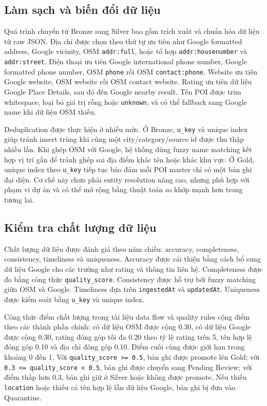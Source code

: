 \documentclass[12pt,a4paper]{article}
\begin{document}
\subsection{Làm sạch và biến đổi dữ liệu}

Quá trình chuyển từ Bronze sang Silver bao gồm trích xuất và chuẩn hóa dữ liệu từ raw JSON. Địa chỉ được chọn theo thứ tự ưu tiên như Google formatted address, Google vicinity, OSM \texttt{addr:full}, hoặc tổ hợp \texttt{addr:housenumber} và \texttt{addr:street}. Điện thoại ưu tiên Google international phone number, Google formatted phone number, OSM \texttt{phone} rồi OSM \texttt{contact:phone}. Website ưu tiên Google website, OSM website rồi OSM contact website. Rating ưu tiên dữ liệu Google Place Details, sau đó đến Google nearby result. Tên POI được trim whitespace, loại bỏ giá trị rỗng hoặc \texttt{unknown}, và có thể fallback sang Google name khi dữ liệu OSM thiếu.

Deduplication được thực hiện ở nhiều mức. Ở Bronze, \texttt{u\_key} và unique index giúp tránh insert trùng khi cùng một city/category/source id được thu thập nhiều lần. Khi ghép OSM với Google, hệ thống dùng fuzzy name matching kết hợp vị trí gần để tránh ghép sai địa điểm khác tên hoặc khác khu vực. Ở Gold, unique index theo \texttt{u\_key} tiếp tục bảo đảm mỗi POI master chỉ có một bản ghi đại diện. Cơ chế này chưa phải entity resolution nâng cao, nhưng phù hợp với phạm vi dự án và có thể mở rộng bằng thuật toán so khớp mạnh hơn trong tương lai.

\subsection{Kiểm tra chất lượng dữ liệu}

Chất lượng dữ liệu được đánh giá theo năm chiều: accuracy, completeness, consistency, timeliness và uniqueness. Accuracy được cải thiện bằng cách bổ sung dữ liệu Google cho các trường như rating và thông tin liên hệ. Completeness được đo bằng công thức \texttt{quality\_score}. Consistency được hỗ trợ bởi fuzzy matching giữa OSM và Google. Timeliness dựa trên \texttt{ingestedAt} và \texttt{updatedAt}. Uniqueness được kiểm soát bằng \texttt{u\_key} và unique index.

Công thức điểm chất lượng trong tài liệu data flow và quality rules cộng điểm theo các thành phần chính: có dữ liệu OSM được cộng 0.30, có dữ liệu Google được cộng 0.30, rating đóng góp tối đa 0.20 theo tỷ lệ rating trên 5, tên hợp lệ đóng góp 0.10 và địa chỉ đóng góp 0.10. Điểm cuối cùng được giới hạn trong khoảng 0 đến 1. Với \texttt{quality\_score >= 0.5}, bản ghi được promote lên Gold; với \texttt{0.3 <= quality\_score < 0.5}, bản ghi được chuyển sang Pending Review; với điểm thấp hơn 0.3, bản ghi giữ ở Silver hoặc không được promote. Nếu thiếu \texttt{location} hoặc thiếu cả tên hợp lệ lẫn dữ liệu Google, bản ghi bị đưa vào Quarantine.
\end{document}
